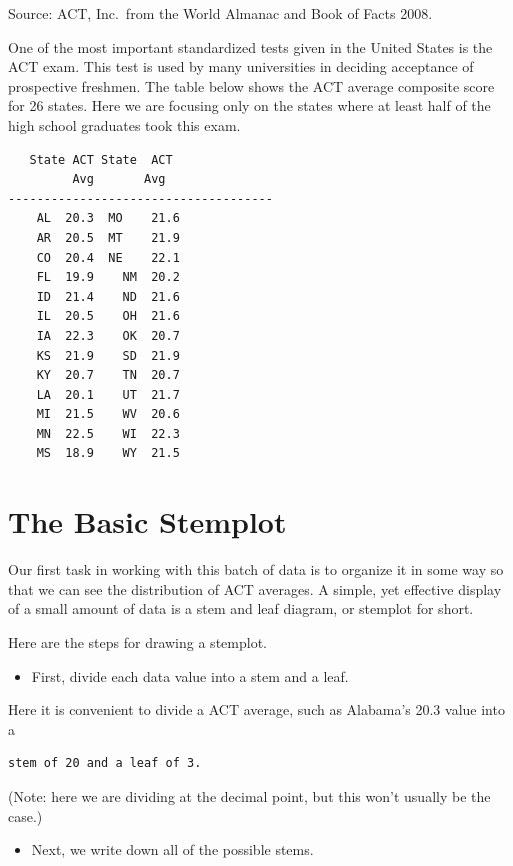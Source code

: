 \documentclass[
]{book}
\providecommand{\tightlist}{%
  \setlength{\itemsep}{0pt}\setlength{\parskip}{0pt}}
\begin{document}
Source: ACT, Inc.~from the World Almanac and Book of Facts 2008.

One of the most important standardized tests given in the United States is the ACT exam. This test is used by many universities in deciding acceptance of prospective freshmen. The table below shows the ACT average composite score for 26 states. Here we are focusing only on the states where at least half of the high school graduates took this exam.

\begin{verbatim}
   State ACT State  ACT 
         Avg       Avg
-------------------------------------
    AL  20.3  MO    21.6
    AR  20.5  MT    21.9
    CO  20.4  NE    22.1
    FL  19.9    NM  20.2
    ID  21.4    ND  21.6
    IL  20.5    OH  21.6
    IA  22.3    OK  20.7
    KS  21.9    SD  21.9
    KY  20.7    TN  20.7
    LA  20.1    UT  21.7
    MI  21.5    WV  20.6
    MN  22.5    WI  22.3
    MS  18.9    WY  21.5
\end{verbatim}

\hypertarget{the-basic-stemplot}{%
\section{The Basic Stemplot}\label{the-basic-stemplot}}

Our first task in working with this batch of data is to organize it in some way so that we can see the distribution of ACT averages. A simple, yet effective display of a small amount of data is a stem and leaf diagram, or stemplot for short.

Here are the steps for drawing a stemplot.

\begin{itemize}
\tightlist
\item
  First, divide each data value into a stem and a leaf.
\end{itemize}

Here it is convenient to divide a ACT average, such as Alabama's
20.3 value into a

\begin{verbatim}
stem of 20 and a leaf of 3.
\end{verbatim}

(Note: here we are dividing at the decimal point, but this won't usually be the case.)

\begin{itemize}
\tightlist
\item
  Next, we write down all of the possible stems.
\end{itemize}
\end{document}
